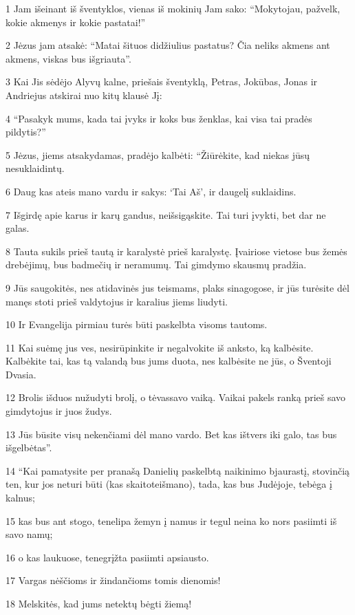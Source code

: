 \par 1 Jam išeinant iš šventyklos, vienas iš mokinių Jam sako: “Mokytojau, pažvelk, kokie akmenys ir kokie pastatai!” 
\par 2 Jėzus jam atsakė: “Matai šituos didžiulius pastatus? Čia neliks akmens ant akmens, viskas bus išgriauta”. 
\par 3 Kai Jis sėdėjo Alyvų kalne, priešais šventyklą, Petras, Jokūbas, Jonas ir Andriejus atskirai nuo kitų klausė Jį: 
\par 4 “Pasakyk mums, kada tai įvyks ir koks bus ženklas, kai visa tai pradės pildytis?” 
\par 5 Jėzus, jiems atsakydamas, pradėjo kalbėti: “Žiūrėkite, kad niekas jūsų nesuklaidintų. 
\par 6 Daug kas ateis mano vardu ir sakys: ‘Tai Aš’, ir daugelį suklaidins. 
\par 7 Išgirdę apie karus ir karų gandus, neišsigąskite. Tai turi įvykti, bet dar ne galas. 
\par 8 Tauta sukils prieš tautą ir karalystė prieš karalystę. Įvairiose vietose bus žemės drebėjimų, bus badmečių ir neramumų. Tai gimdymo skausmų pradžia. 
\par 9 Jūs saugokitės, nes atidavinės jus teismams, plaks sinagogose, ir jūs turėsite dėl manęs stoti prieš valdytojus ir karalius jiems liudyti. 
\par 10 Ir Evangelija pirmiau turės būti paskelbta visoms tautoms. 
\par 11 Kai suėmę jus ves, nesirūpinkite ir negalvokite iš anksto, ką kalbėsite. Kalbėkite tai, kas tą valandą bus jums duota, nes kalbėsite ne jūs, o Šventoji Dvasia. 
\par 12 Brolis išduos nužudyti brolį, o tėvas­savo vaiką. Vaikai pakels ranką prieš savo gimdytojus ir juos žudys. 
\par 13 Jūs būsite visų nekenčiami dėl mano vardo. Bet kas ištvers iki galo, tas bus išgelbėtas”. 
\par 14 “Kai pamatysite per pranašą Danielių paskelbtą naikinimo bjaurastį, stovinčią ten, kur jos neturi būti (kas skaito­teišmano), tada, kas bus Judėjoje, tebėga į kalnus; 
\par 15 kas bus ant stogo, tenelipa žemyn į namus ir tegul neina ko nors pasiimti iš savo namų; 
\par 16 o kas laukuose, tenegrįžta pasiimti apsiausto. 
\par 17 Vargas nėščioms ir žindančioms tomis dienomis! 
\par 18 Melskitės, kad jums netektų bėgti žiemą! 

